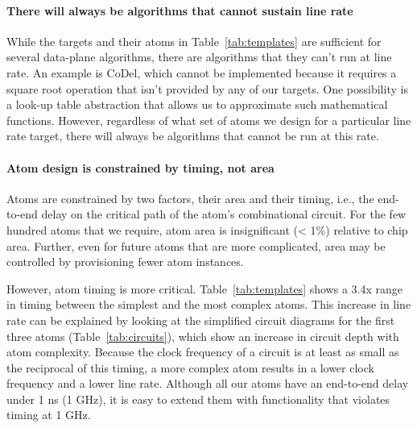 \paragraph{There will always be algorithms that cannot sustain line rate}

While the targets and their atoms in Table~\ref{tab:templates} are sufficient
for several data-plane algorithms, there are algorithms that they can't run at
line rate.  An example is CoDel, which cannot be implemented because it
requires a square root operation that isn't provided by any of our targets. One
possibility is a look-up table abstraction that allows us to approximate such
mathematical functions. However, regardless of what set of atoms we design for
a particular line rate target, there will always be algorithms that
cannot be run at this rate.


\paragraph{Atom design is constrained by timing, not area}

Atoms are constrained by two factors, their area and their timing, i.e., the
end-to-end delay on the critical path of the atom's combinational circuit. For
the few hundred atoms that we require, atom area is insignificant (< 1\%)
relative to chip area. Further, even for future atoms that are more
complicated, area may be controlled by provisioning fewer atom instances.

However, atom timing is more critical. Table~\ref{tab:templates} shows a 3.4x
range in timing between the simplest and the most complex atoms. This increase
in line rate can be explained by looking at the simplified circuit diagrams for
the first three atoms (Table~\ref{tab:circuits}), which show an increase in
circuit depth with atom complexity. Because the clock frequency of a circuit is at
least as small as the reciprocal of this timing, a more complex atom
results in a lower clock frequency and a lower line rate. Although all our atoms
have an end-to-end delay under  1 ns (1 GHz), it is easy to
extend them with functionality that violates timing at 1 GHz.

